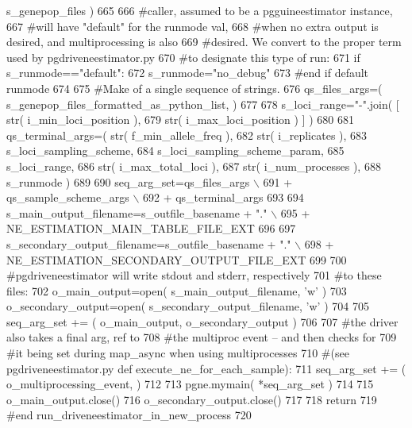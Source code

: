 \begin{DoxyCode}
      s\_genepop\_files )
665 
666     \textcolor{comment}{#caller, assumed to be a pgguineestimator instance,}
667     \textcolor{comment}{#will have "default" for the runmode val, }
668     \textcolor{comment}{#when no extra output is desired, and multiprocessing is also}
669     \textcolor{comment}{#desired.  We convert to the proper term used by pgdriveneestimator.py}
670     \textcolor{comment}{#to designate this type of run:}
671     \textcolor{keywordflow}{if} s\_runmode==\textcolor{stringliteral}{"default"}:
672         s\_runmode=\textcolor{stringliteral}{"no\_debug"}
673     \textcolor{comment}{#end if default runmode}
674 
675     \textcolor{comment}{#Make of a single sequence of strings.}
676     qs\_files\_args=( s\_genepop\_files\_formatted\_as\_python\_list, ) 
677 
678     s\_loci\_range=\textcolor{stringliteral}{"-"}.join( [ str( i\_min\_loci\_position ),
679                                 str( i\_max\_loci\_position ) ] )
680 
681     qs\_terminal\_args=( str( f\_min\_allele\_freq ), 
682                                 str( i\_replicates ), 
683                                 s\_loci\_sampling\_scheme,
684                                 s\_loci\_sampling\_scheme\_param,
685                                 s\_loci\_range,
686                                 str( i\_max\_total\_loci ),
687                                 str( i\_num\_processes ), 
688                                 s\_runmode )
689 
690     seq\_arg\_set=qs\_files\_args \(\backslash\)
691                     + qs\_sample\_scheme\_args \(\backslash\)
692                     + qs\_terminal\_args
693 
694     s\_main\_output\_filename=s\_outfile\_basename + \textcolor{stringliteral}{"."} \(\backslash\)
695             + NE\_ESTIMATION\_MAIN\_TABLE\_FILE\_EXT
696 
697     s\_secondary\_output\_filename=s\_outfile\_basename + \textcolor{stringliteral}{"."} \(\backslash\)
698             + NE\_ESTIMATION\_SECONDARY\_OUTPUT\_FILE\_EXT
699 
700     \textcolor{comment}{#pgdriveneestimator will write stdout and stderr, respectively}
701     \textcolor{comment}{#to these files:}
702     o\_main\_output=open( s\_main\_output\_filename, \textcolor{stringliteral}{'w'} )
703     o\_secondary\_output=open( s\_secondary\_output\_filename, \textcolor{stringliteral}{'w'} )
704 
705     seq\_arg\_set += ( o\_main\_output, o\_secondary\_output )
706     
707     \textcolor{comment}{#the driver also takes a final arg, ref to}
708     \textcolor{comment}{#the multiproc event -- and then checks for }
709     \textcolor{comment}{#it being set during map\_async when using multiprocesses}
710     \textcolor{comment}{#(see pgdriveneestimator.py def execute\_ne\_for\_each\_sample):}
711     seq\_arg\_set += ( o\_multiprocessing\_event, )
712 
713     pgne.mymain( *seq\_arg\_set )
714 
715     o\_main\_output.close()
716     o\_secondary\_output.close()
717 
718     \textcolor{keywordflow}{return}
719 \textcolor{comment}{#end run\_driveneestimator\_in\_new\_process}
720 
\end{DoxyCode}

